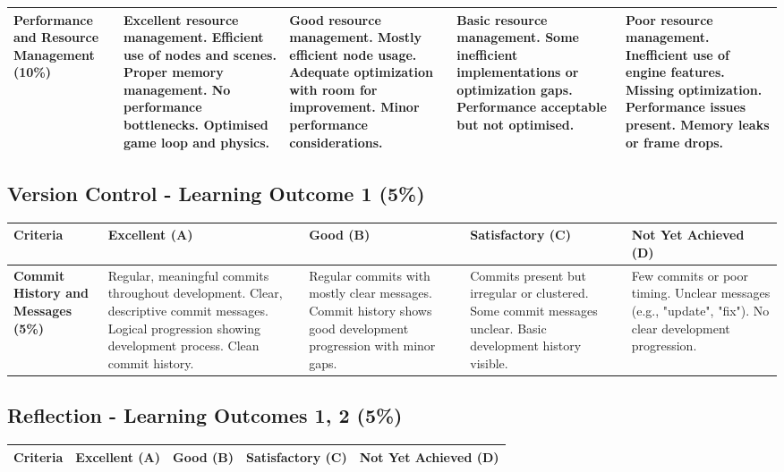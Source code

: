 \documentclass{article}
\begin{document}
\begin{landscape}
\begin{tabular}{|p{5cm}|p{4cm}|p{4cm}|p{4cm}|p{4cm}|}
\textbf{Performance and Resource Management (10\%)} & 
Excellent resource management. Efficient use of nodes and scenes. Proper memory management. No performance bottlenecks. Optimised game loop and physics. & 
Good resource management. Mostly efficient node usage. Adequate optimization with room for improvement. Minor performance considerations. & 
Basic resource management. Some inefficient implementations or optimization gaps. Performance acceptable but not optimised. & 
Poor resource management. Inefficient use of engine features. Missing optimization. Performance issues present. Memory leaks or frame drops. \\ \hline

\end{tabular}

\subsection*{Version Control - Learning Outcome 1 (5\%)}

\begin{tabular}{|p{5cm}|p{4cm}|p{4cm}|p{4cm}|p{4cm}|}
\hline
\textbf{Criteria} & \textbf{Excellent (A)} & \textbf{Good (B)} & \textbf{Satisfactory (C)} & \textbf{Not Yet Achieved (D)} \\ \hline

\textbf{Commit History and Messages (5\%)} & 
Regular, meaningful commits throughout development. Clear, descriptive commit messages. Logical progression showing development process. Clean commit history. & 
Regular commits with mostly clear messages. Commit history shows good development progression with minor gaps. & 
Commits present but irregular or clustered. Some commit messages unclear. Basic development history visible. & 
Few commits or poor timing. Unclear messages (e.g., "update", "fix"). No clear development progression. \\ \hline

\end{tabular}

\subsection*{Reflection - Learning Outcomes 1, 2 (5\%)}

\begin{tabular}{|p{5cm}|p{4cm}|p{4cm}|p{4cm}|p{4cm}|}
\hline
\textbf{Criteria} & \textbf{Excellent (A)} & \textbf{Good (B)} & \textbf{Satisfactory (C)} & \textbf{Not Yet Achieved (D)} \\ \hline


\end{tabular}
\end{landscape}
\end{document}
